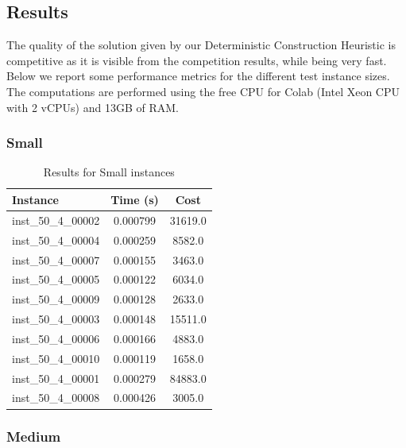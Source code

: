 \documentclass{article}
\begin{document}
\subsection*{Results}
The quality of the solution given by our Deterministic Construction Heuristic is competitive as it is visible from the competition results, while being very fast. Below we report some performance metrics for the different test instance sizes. The computations are performed using the free CPU for Colab (Intel Xeon CPU with 2 vCPUs) and 13GB of RAM.

\subsubsection*{Small}
\begin{table}[H]
\centering
\begin{tabular}{lcc}
\toprule
\textbf{Instance}         & \textbf{Time (s)} & \textbf{Cost} \\ 
\midrule
inst\_50\_4\_00002 & 0.000799 & 31619.0 \\ 
inst\_50\_4\_00004 & 0.000259 & 8582.0  \\ 
inst\_50\_4\_00007 & 0.000155 & 3463.0  \\ 
inst\_50\_4\_00005 & 0.000122 & 6034.0  \\ 
inst\_50\_4\_00009 & 0.000128 & 2633.0  \\ 
inst\_50\_4\_00003 & 0.000148 & 15511.0 \\ 
inst\_50\_4\_00006 & 0.000166 & 4883.0  \\ 
inst\_50\_4\_00010 & 0.000119 & 1658.0  \\ 
inst\_50\_4\_00001 & 0.000279 & 84883.0 \\ 
inst\_50\_4\_00008 & 0.000426 & 3005.0  \\ 
\bottomrule
\end{tabular}
\caption{Results for Small instances}
\end{table}

\subsubsection*{Medium}
\end{document}
